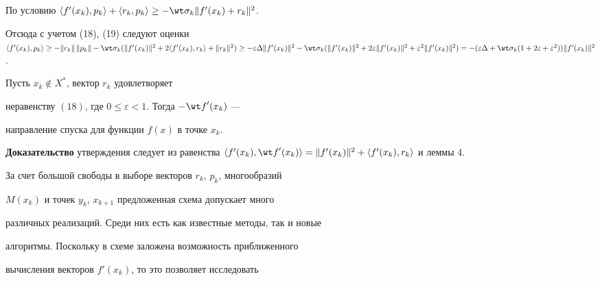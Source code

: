 \begin{pf}


По условию $\langle {{f}'(x_k),p_k} \rangle +\langle


{r_k,p_k} \rangle \ge -\wt \sigma_k \|{{f}'(x_k)+r_k} \|^2$.


Отсюда с учетом (18), (19) следуют оценки $\langle {{f}'(x_k),p_k}


\rangle \ge - \|{r_k} \|\,\|{p_k} \|-\wt \sigma_k


(\|{{f}'(x_k)} \|^2+2\langle {{f}'(x_k),r_k} \rangle +


\|{r_k} \|^2)\ge -\varepsilon \Delta \|{{f}'(x_k)}


\|^2-\wt \sigma_k(\|{{f}'(x_k)} \|^2+2\varepsilon \|{{f}'(x_k)} \|^2


+\varepsilon^2 \|{{f}'(x_k)} \|^2)= -(\varepsilon \Delta +\wt \sigma_k(1+2


\varepsilon +\varepsilon^2)) \|{{f}'(x_k)} \|^2$.


\end{pf}





\begin{lem}


Пусть $x_k\notin X^*$, вектор $r_k$ удовлетворяет


неравенству $(18)$, где $0\le \varepsilon <1$. Тогда $-{\wt f}'(x_k)$ ---


направление спуска для функции $f(x)$ в точке $x_k$.


\end{lem}





{\bf Доказательство} утверждения следует из равенства $\langle


{{f}'(x_k),{\wt f}'(x_k)} \rangle = \|{{f}'(x_k)} \|^2


+\langle {{f}'(x_k),r_k} \rangle$ и леммы 4.





За счет большой свободы в выборе векторов $r_k$, $p_k$, многообразий


$M(x_k)$ и точек $y_k$, $x_{k+1}$ предложенная схема допускает много


различных реализаций. Среди них есть как известные методы, так и новые


алгоритмы. Поскольку в схеме заложена возможность приближенного


вычисления векторов ${f}'(x_k)$, то это позволяет исследовать



